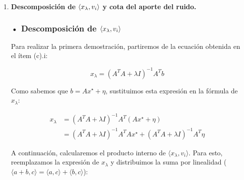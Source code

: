 \documentclass{article}
\begin{document}
\begin{enumerate}[label=\roman*., widest=iv]
  Para encontrar este punto, igualaremos el gradiente calculado en un inicio a cero:

  \[
  \nabla J_\lambda(x)=2A^T(Ax-b)+2\lambda x=0
  \]

  Simplificamos dividiendo por \(2\) y reordenamos términos:

  \[
  \begin{aligned}
  A^T(Ax-b)+\lambda x&=0\\
  A^TAx-A^Tb+\lambda x&=0\\
  A^TAx+\lambda x&=A^Tb\\
  (A^TA+\lambda I)x&=A^Tb
  \end{aligned}
  \]

  Como los valores propios de \((A^TA+\lambda I)\) son estrictamente positivos, la matriz es invertible. Al multiplicar por su inversa, despejamos la solución única:

  \[
  \boxed{x_\lambda=(A^TA+\lambda I)^{-1}A^Tb}
  \]

  Con esto se concluye que \(J_\lambda(x)\) tiene un único minimizador global, y es \(x_\lambda\).

  \bigskip

  \item \textbf{Descomposición de $\langle x_\lambda, v_i\rangle$ y cota del aporte del ruido.}

  \subsubsection*{• Descomposición de $\langle x_\lambda, v_i\rangle$}

  Para realizar la primera demostración, partiremos de la ecuación obtenida en el ítem (c).i:

  \[
  x_\lambda=(A^TA+\lambda I)^{-1}A^Tb
  \]

  Como sabemos que \(b=Ax^\star+\eta\), sustituimos esta expresión en la fórmula de \(x_\lambda\):

  \[
  \begin{aligned}
  x_\lambda&=(A^TA+\lambda I)^{-1}A^T(Ax^\star+\eta)\\
  &=(A^TA+\lambda I)^{-1}A^TAx^\star+(A^TA+\lambda I)^{-1}A^T\eta
  \end{aligned}
  \]

  A continuación, calcularemos el producto interno de \(\langle x_\lambda,v_i\rangle\). Para esto, reemplazamos la expresión de \(x_\lambda\) y distribuimos la suma por linealidad (\(\langle a+b,c\rangle=\langle a,c\rangle+\langle b,c\rangle\)):


\end{enumerate}
\end{document}
